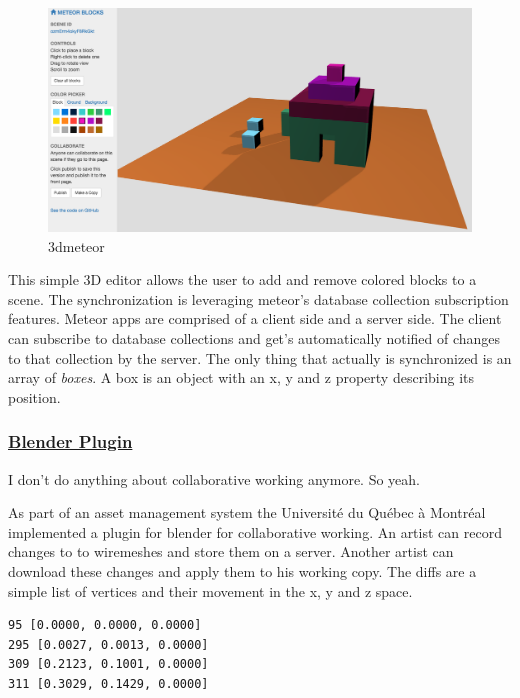\begin{figure}[htbp]
\centering
\includegraphics{../assets/3dmeteor.png}
\caption{3dmeteor}
\end{figure}

This simple 3D editor allows the user to add and remove colored blocks
to a scene. The synchronization is leveraging meteor's database
collection subscription features. Meteor apps are comprised of a client
side and a server side. The client can subscribe to database collections
and get's automatically notified of changes to that collection by the
server. The only thing that actually is synchronized is an array of
\emph{boxes}. A box is an object with an x, y and z property describing
its position.

\subsubsection{\texorpdfstring{\href{http://www.researchgate.net/publication/221610780_A_Blender_Plugin_for_Collaborative_Work_on_the_Articiel_Platform}{Blender
Plugin}}{Blender Plugin}}\label{blender-plugin10}

I don't do anything about collaborative working anymore. So yeah.

As part of an asset management system the Université du Québec à
Montréal implemented a plugin for blender for collaborative working. An
artist can record changes to to wiremeshes and store them on a server.
Another artist can download these changes and apply them to his working
copy. The diffs are a simple list of vertices and their movement in the
x, y and z space.

\begin{verbatim}
95 [0.0000, 0.0000, 0.0000]
295 [0.0027, 0.0013, 0.0000]
309 [0.2123, 0.1001, 0.0000]
311 [0.3029, 0.1429, 0.0000]
\end{verbatim}

